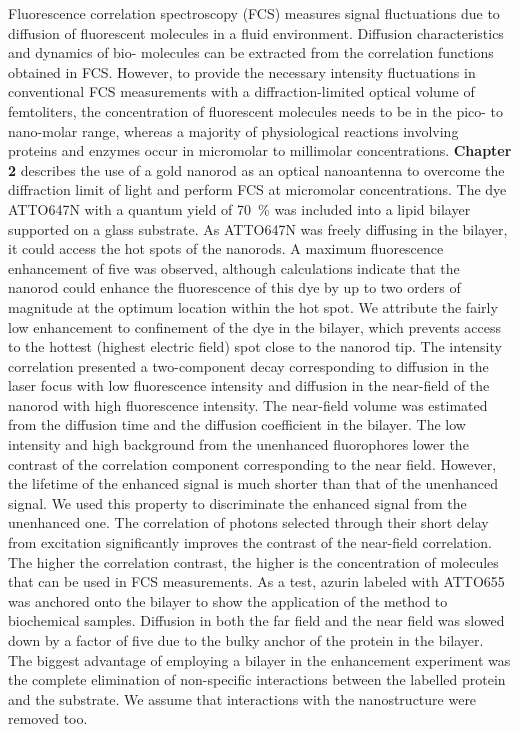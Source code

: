 Fluorescence correlation spectroscopy (FCS) measures signal fluctuations due to diffusion of fluorescent molecules in a fluid environment.
Diffusion characteristics and dynamics of bio- molecules can be extracted from the correlation functions obtained in FCS.
However, to provide the necessary intensity fluctuations in conventional FCS measurements with a diffraction-limited optical volume of femtoliters, the concentration of fluorescent molecules needs to be in the pico- to nano-molar range, whereas a majority of physiological reactions involving proteins and enzymes occur in micromolar to millimolar concentrations. 
\textbf{Chapter 2} describes the use of a gold nanorod as an optical nanoantenna to overcome the diffraction limit of light and perform FCS at micromolar concentrations.
The dye ATTO647N with a quantum yield of \SI{70}{\percent} was included into a lipid bilayer supported on a glass substrate.
As ATTO647N was freely diffusing in the bilayer, it could access the hot spots of the nanorods.
A maximum fluorescence enhancement of five was observed, although calculations indicate that the nanorod could enhance the fluorescence of this dye by up to two orders of magnitude at the optimum location within the hot spot.
We attribute the fairly low enhancement to confinement of the dye in the bilayer, which prevents access to the hottest (highest electric field) spot close to the nanorod tip.
The intensity correlation presented a two-component decay corresponding to diffusion in the laser focus with low fluorescence intensity and diffusion in the near-field of the nanorod with high fluorescence intensity.
The near-field volume was estimated from the diffusion time and the diffusion coefficient in the bilayer.
The low intensity and high background from the unenhanced fluorophores lower the contrast of the correlation component corresponding to the near field.
However, the lifetime of the enhanced signal is much shorter than that of the unenhanced signal. We used this property to discriminate the enhanced signal from the unenhanced one.
The correlation of photons selected through their short delay from excitation significantly improves the contrast of the near-field correlation.
The higher the correlation contrast, the higher is the concentration of molecules that can be used in FCS measurements.
As a test, azurin labeled with ATTO655 was anchored onto the bilayer to show the application of the method to biochemical samples.
Diffusion in both the far field and the near field was slowed down by a factor of five due to the bulky anchor of the protein in the bilayer.
The biggest advantage of employing a bilayer in the enhancement experiment was the complete elimination of non-specific interactions between the labelled protein and the substrate.
We assume that interactions with the nanostructure were removed too.


